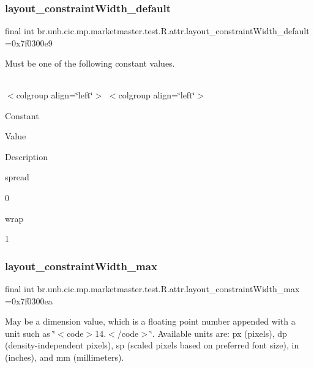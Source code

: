 \subsubsection{\texorpdfstring{layout\+\_\+constraint\+Width\+\_\+default}{layout\_constraintWidth\_default}}
{\footnotesize\ttfamily final int br.\+unb.\+cic.\+mp.\+marketmaster.\+test.\+R.\+attr.\+layout\+\_\+constraint\+Width\+\_\+default =0x7f0300e9\hspace{0.3cm}{\ttfamily [static]}}

Must be one of the following constant values.

\tabulinesep=1mm
\begin{longtabu} spread 0pt [c]{*{0}{|X[-1]}|}
\hline
\end{longtabu}
$<$colgroup align=\char`\"{}left\char`\"{}$>$ $<$colgroup align=\char`\"{}left\char`\"{}$>$ 

Constant

Value

Description 

spread

0

wrap

1\mbox{\label{classbr_1_1unb_1_1cic_1_1mp_1_1marketmaster_1_1test_1_1R_1_1attr_ab4f8a0d6174d3083d49aa6e2068d4a2a}} 
\subsubsection{\texorpdfstring{layout\+\_\+constraint\+Width\+\_\+max}{layout\_constraintWidth\_max}}
{\footnotesize\ttfamily final int br.\+unb.\+cic.\+mp.\+marketmaster.\+test.\+R.\+attr.\+layout\+\_\+constraint\+Width\+\_\+max =0x7f0300ea\hspace{0.3cm}{\ttfamily [static]}}

May be a dimension value, which is a floating point number appended with a unit such as \char`\"{}$<$code$>$14.\+5sp$<$/code$>$\char`\"{}. Available units are\+: px (pixels), dp (density-\/independent pixels), sp (scaled pixels based on preferred font size), in (inches), and mm (millimeters). \mbox{\label{classbr_1_1unb_1_1cic_1_1mp_1_1marketmaster_1_1test_1_1R_1_1attr_af86a7604267f49eab5a29f21f5e4872d}} 
